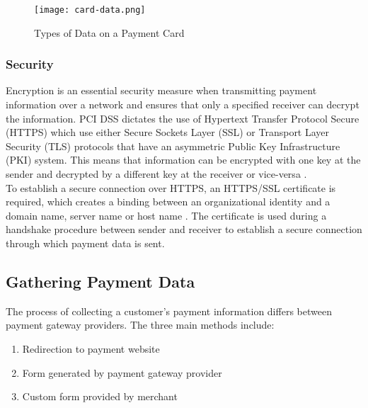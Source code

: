 \begin{figure}[!hbt]
  \centering
 	\texttt{[image: card-data.png]}
  \caption{Types of Data on a Payment Card\cite{card-data}}
 	\label{fig:card-data}
\end{figure}

\subsubsection{Security}
\label{subsec:security}

Encryption is an essential security measure when transmitting payment information over a network and ensures that only a specified receiver can decrypt the information. PCI DSS dictates the use of Hypertext Transfer Protocol Secure (HTTPS) which use either Secure Sockets Layer (SSL) or Transport Layer Security (TLS) protocols that have an asymmetric Public Key Infrastructure (PKI) system. This means that information can be encrypted with one key at the sender and decrypted by a different key at the receiver or vice-versa \cite{comodo}.\\

To establish a secure connection over HTTPS, an HTTPS/SSL certificate is required, which creates a binding between an organizational identity and a domain name, server name or host name \cite{ssl-certificate}. The certificate is used during a handshake procedure between sender and receiver to establish a secure connection through which payment data is sent.

\subsection{Gathering Payment Data}
\label{subsec:gathering-payment-data}

The process of collecting a customer's payment information differs between payment gateway providers. The three main methods include:

\begin{enumerate}
	\item Redirection to payment website
  \item Form generated by payment gateway provider
  \item Custom form provided by merchant
\end{enumerate}

